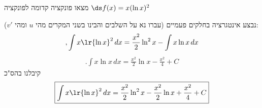 מצאו פונקציה קדומה לפונקציה
$\ds f(x)=x(\ln x)^2$
\begin{solbox}
נבצע אינטגרציה בחלקים פעמיים
(עברו נא על השלבים והבינו בשני המקרים מהי
$u$
ומהי
$v'$):
\begin{align*}
,\int x\lr{\ln x}^2\,dx
=\frac{x^2}{2}\ln^2x-\int x\ln x\,dx
\end{align*}
\begin{align*}
.\int x\ln x\,dx=\frac{x^2}{2}\ln x-\frac{x^2}{4}+C
\end{align*}
קיבלנו בהס"כ
\begin{align*}
\boxed{\int x\lr{\ln x}^2\,dx=\frac{x^2}{2}\ln^2x-\frac{x^2}{2}\ln x+\frac{x^2}{4}+C}
\end{align*}
\end{solbox}
